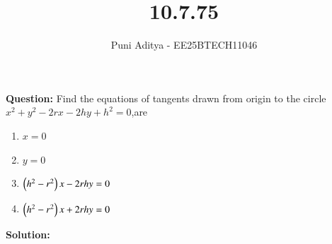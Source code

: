 \documentclass[journal]{IEEEtran}
\begin{document}
\title{10.7.75}
\author{Puni Aditya - EE25BTECH11046}
\maketitle

\textbf{Question:}
Find the equations of tangents drawn from origin to the circle $x^2+y^2-2rx-2hy+h^2=0$,are
\begin{multicols}{2}
\begin{enumerate}
    \item $x=0$
    \item $y=0$
    \item $\left(h^2-r^2\right)x-2rhy=0$
    \item $\left(h^2-r^2\right)x+2rhy=0$
\end{enumerate}
\end{multicols}

\textbf{Solution:}
\end{document}
